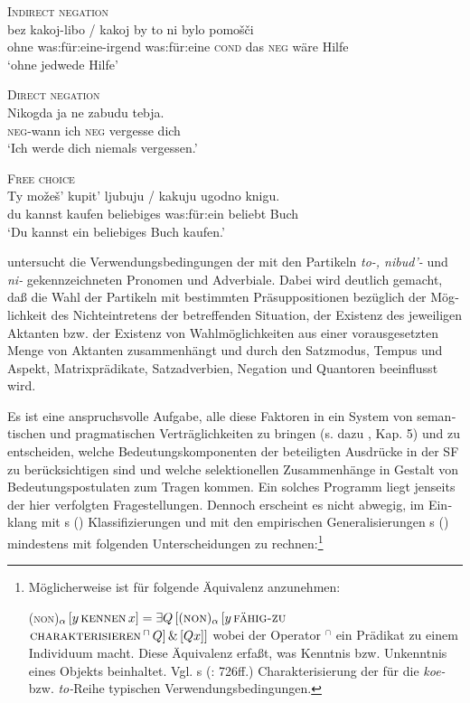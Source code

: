 \documentclass[output=paper, colorlinks, citecolor=brown, booklanguage=german]{langscibook}
\begin{document}
\begin{otherlanguage}{german}
\ea \textsc{Indirect negation}\\
    \gll bez kakoj-libo / kakoj by to ni bylo pomošči \\
    ohne was:für:eine-irgend {} was:für:eine \textsc{cond} das \textsc{neg} wäre Hilfe\\
    \glt `ohne jedwede Hilfe'
\z 

\ea \textsc{Direct negation}\\
    \gll Nikogda ja ne zabudu tebja. \\
    \textsc{neg}-wann ich \textsc{neg} vergesse dich \\
    \glt `Ich werde dich niemals vergessen.'
\z 

\ea \textsc{Free choice}\\
    \gll Ty možeš' kupit' ljubuju / kakuju ugodno knigu. \\
    du kannst kaufen beliebiges {} was:für:ein beliebt Buch \\
    \glt `Du kannst ein beliebiges Buch kaufen.'
\z 

\noindent \citet{Seliverstova1988} untersucht die Verwendungsbedingungen der mit den Partikeln \textit{to-, nibud'-} und \textit{ni-} gekennzeichneten Pronomen und Adverbiale. Dabei wird deutlich gemacht, daß die Wahl der Partikeln mit bestimmten Präsuppositionen bezüglich der Möglichkeit des Nichteintretens der betreffenden Situation, der Existenz des jeweiligen Aktanten bzw. der Existenz von Wahlmöglichkeiten aus einer vorausgesetzten Menge von Aktanten zusammenhängt und durch den Satzmodus, Tempus und Aspekt, Matrixprädikate, Satzadverbien, Negation und Quantoren beeinflusst wird.

Es ist eine anspruchsvolle Aufgabe, alle diese Faktoren in ein System von semantischen und pragmatischen Verträglichkeiten zu bringen (s. dazu \citealt{Blaszczak2000}, Kap. 5) und zu entscheiden, welche Bedeutungskomponenten der beteiligten Ausdrücke in der SF zu berücksichtigen sind und welche selektionellen Zusammenhänge in Gestalt von Bedeutungspostulaten zum Tragen kommen. Ein solches Programm liegt jenseits der hier verfolgten Fragestellungen. Dennoch erscheint es nicht abwegig, im Einklang mit \citeauthor{Haspelmath1993}s (\citeyear{Haspelmath1993}) Klassifizierungen und mit den empirischen Generalisierungen \citeauthor{Seliverstova1988}s (\citeyear{Seliverstova1988}) mindestens mit folgenden Unterscheidungen zu rechnen:\footnote{Möglicherweise ist für  folgende Äquivalenz anzunehmen:
    
    \ea (\textsc{non})$_\alpha\, [ y\, \textsc{kennen}\, x ] = \exists Q\, [(\textsc{non})_\alpha\, [ y\, \textsc{fähig-zu}$ \linebreak $\textsc{charakterisieren}\, ^\cap\, Q]\, \&\, [ Q x ]]$
    \z 
    \noindent wobei der Operator $^\cap$ ein Prädikat zu einem Individuum macht. Diese Äquivalenz erfaßt, was Kenntnis bzw. Unkenntnis eines Objekts beinhaltet. Vgl. \citeauthor{Ruzicka1973}s (\citeyear{Ruzicka1973}: 726ff.) Cha\-rak\-te\-ri\-sie\-rung der für die \textit{koe-} bzw. \textit{to-}Reihe typischen Verwendungsbedingungen.}


\end{otherlanguage}
\end{document}
